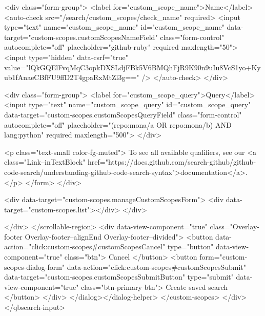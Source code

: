           <div class="form-group">
            <label for="custom_scope_name">Name</label>
            <auto-check src="/search/custom_scopes/check_name" required>
              <input
                type="text"
                name="custom_scope_name"
                id="custom_scope_name"
                data-target="custom-scopes.customScopesNameField"
                class="form-control"
                autocomplete="off"
                placeholder="github-ruby"
                required
                maxlength="50">
              <input type="hidden" data-csrf="true" value="lQkGQElFvqMqC3opkDXSLdjFBk5V6BMQhFjR9K90n9uIu8VcS1yo+Kyub1fAnaeCBfFU9ffD2T4gpaRxMtZl3g==" />
            </auto-check>
          </div>

          <div class="form-group">
            <label for="custom_scope_query">Query</label>
            <input
              type="text"
              name="custom_scope_query"
              id="custom_scope_query"
              data-target="custom-scopes.customScopesQueryField"
              class="form-control"
              autocomplete="off"
              placeholder="(repo:mona/a OR repo:mona/b) AND lang:python"
              required
              maxlength="500">
          </div>

          <p class="text-small color-fg-muted">
            To see all available qualifiers, see our <a class="Link--inTextBlock" href="https://docs.github.com/search-github/github-code-search/understanding-github-code-search-syntax">documentation</a>.
          </p>
</form>        </div>

        <div data-target="custom-scopes.manageCustomScopesForm">
          <div data-target="custom-scopes.list"></div>
        </div>

</div>
      </scrollable-region>
      <div data-view-component="true" class="Overlay-footer Overlay-footer--alignEnd Overlay-footer--divided">          <button data-action="click:custom-scopes#customScopesCancel" type="button" data-view-component="true" class="btn">    Cancel
</button>
          <button form="custom-scopes-dialog-form" data-action="click:custom-scopes#customScopesSubmit" data-target="custom-scopes.customScopesSubmitButton" type="submit" data-view-component="true" class="btn-primary btn">    Create saved search
</button>
</div>
</dialog></dialog-helper>
    </custom-scopes>
  </div>
</qbsearch-input>


